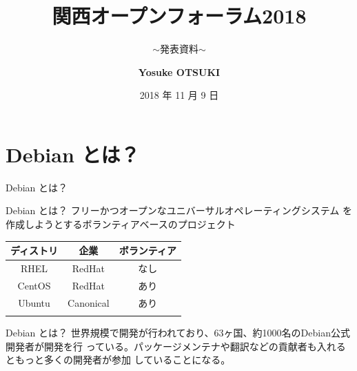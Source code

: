 \documentclass[cjk,dvipdfmx,10pt,compress,%
hyperref={bookmarks=true,bookmarksnumbered=true,bookmarksopen=false,%
colorlinks=false,%
pdftitle={第 132 回 関西 Debian 勉強会},%
pdfauthor={かわだ},%
pdfsubject={資料},%
}]{beamer}
\title{関西オープンフォーラム2018}
\subtitle{$\sim$発表資料$\sim$}
\author[Yosuke OTSUKI]{{\large\bf Yosuke OTSUKI}}
\institute[Debian JP]{{\normalsize\tt 関西 Debian 勉強会}}
\date{{\small 2018 年 11 月 9 日}}
\begin{document}
\settitleslide
\begin{frame}
\titlepage
\end{frame}
\setdefaultslide


\begin{frame}[fragile]
\tableofcontents
\end{frame}

\section{Debian とは？}
\begin{frame}\begin{center}\Huge{Debian とは？}\end{center}\end{frame}
\begin{frame}{Debian とは？}
フリーかつオープンなユニバーサルオペレーティングシステム を作成しようとするボランティアベースのプロジェクト
\begin{table}[htb]
  \begin{tabular}{|c|c|c|}
    \hline
    ディストリ & 企業 & ボランティア \\ \hline
    RHEL & RedHat & なし  \\ \hline
    CentOS & RedHat & あり \\ \hline
    Ubuntu  & Canonical & あり \\ \hline
    \color{red}{Debian}  & \color{red}{なし} & \color{red}{あり} \\ \hline
  \end{tabular}
\end{table}
\end{frame}

\begin{frame}{Debian とは？}
 世界規模で開発が行われており、63ヶ国、約1000名のDebian公式開発者が開発を行
 っている。パッケージメンテナや翻訳などの貢献者も入れるともっと多くの開発者が参加
 していることになる。
 \begin{center}
 \end{center}
\end{frame}
\end{document}
